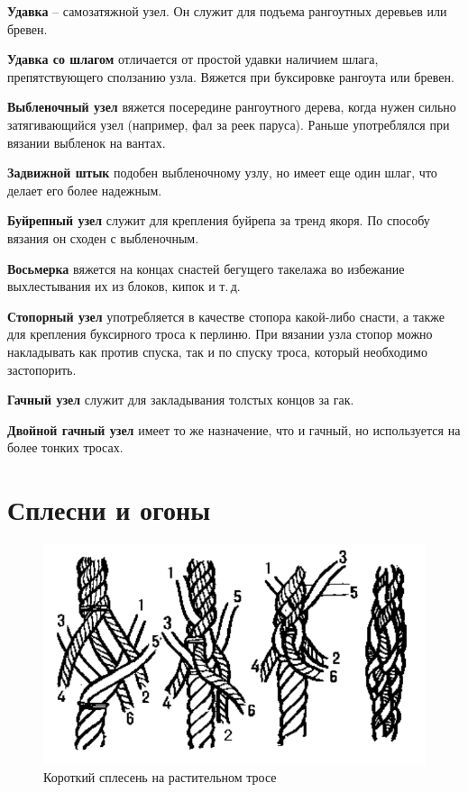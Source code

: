 \documentclass[a4paper, 12pt, twoside, final]{scrbook}
\begin{document}
\textbf{Удавка} \--- самозатяжной узел. Он служит для подъема рангоутных деревьев или бревен.

\textbf{Удавка со шлагом} отличается от простой удавки наличием шлага, препятствующего сползанию узла. Вяжется при буксировке рангоута или бревен.

\textbf{Выбленочный узел} вяжется посередине рангоутного дерева, когда нужен сильно затягивающийся узел (например, фал за реек паруса). Раньше употреблялся при вязании выбленок на вантах.

\textbf{Задвижной штык} подобен выбленочному узлу, но имеет еще один шлаг, что делает его более надежным.

\textbf{Буйрепный узел} служит для крепления буйрепа за тренд якоря. По способу вязания он сходен с выбленочным.

\textbf{Восьмерка} вяжется на концах снастей бегущего такелажа во избежание выхлестывания их из блоков, кипок и т.\,д.

\textbf{Стопорный узел} употребляется в качестве стопора какой-либо снасти, а также для крепления буксирного троса к перлиню. При вязании узла стопор можно накладывать как против спуска, так и по спуску троса, который необходимо застопорить.

\textbf{Гачный узел} служит для закладывания толстых концов за гак.

\textbf{Двойной гачный узел} имеет то же назначение, что и гачный, но используется на более тонких тросах.

\section{Сплесни и огоны}

\begin{figure}
   \centering
   \includegraphics[scale=0.75]{63_Korotkij_splesen} %
   \caption{Короткий сплесень на растительном тросе}
   \label{fig:63}
\end{figure}
\end{document}
